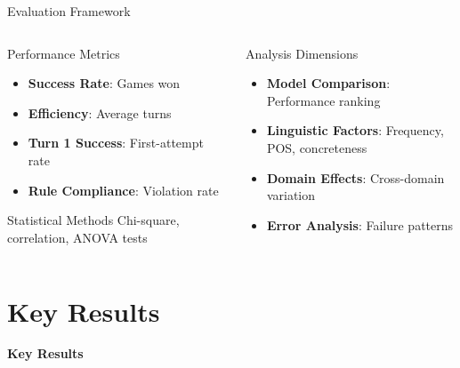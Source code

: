 \documentclass[aspectratio=169]{beamer}
\begin{document}
\begin{frame}{Evaluation Framework}
\begin{columns}[c]
\begin{column}{0.5\textwidth}
\begin{block}{Performance Metrics}
\begin{itemize}
    \item \textbf{Success Rate}: Games won
    \item \textbf{Efficiency}: Average turns
    \item \textbf{Turn 1 Success}: First-attempt rate
    \item \textbf{Rule Compliance}: Violation rate
\end{itemize}
\end{block}

\begin{block}{Statistical Methods}
Chi-square, correlation, ANOVA tests
\end{block}
\end{column}

\begin{column}{0.48\textwidth}
\begin{block}{Analysis Dimensions}
\begin{itemize}
    \item \textbf{Model Comparison}: Performance ranking
    \item \textbf{Linguistic Factors}: Frequency, POS, concreteness
    \item \textbf{Domain Effects}: Cross-domain variation
    \item \textbf{Error Analysis}: Failure patterns
\end{itemize}
\end{block}
\end{column}
\end{columns}
\end{frame}

\section{Key Results}

\begin{frame}
\begin{center}
\Huge \textbf{Key Results}
\end{center}
\end{frame}
\end{document}

